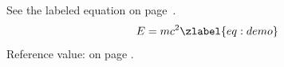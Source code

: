 \documentclass{article}
\begin{document}
See the labeled equation on page~.
\begin{equation}
E = mc^2 \zlabel{eq:demo}
\end{equation}
Reference value:  on page .
\end{document}

